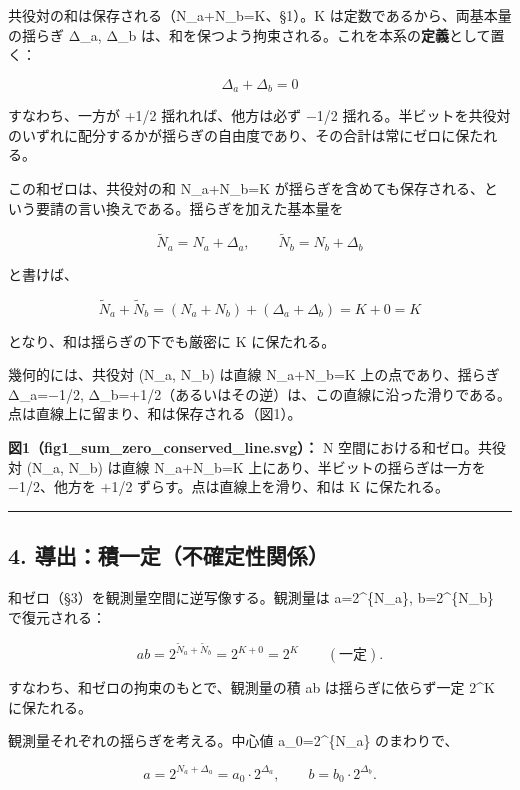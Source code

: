 \documentclass[11pt]{ltjsarticle}
\begin{document}
共役対の和は保存される（N\_a+N\_b=K、§1）。K
は定数であるから、両基本量の揺らぎ Δ\_a, Δ\_b
は、和を保つよう拘束される。これを本系の\textbf{定義}として置く：

\[\boxed{\ \Delta_a + \Delta_b = 0\ }\]

すなわち、一方が +1/2 揺れれば、他方は必ず −1/2
揺れる。半ビットを共役対のいずれに配分するかが揺らぎの自由度であり、その合計は常にゼロに保たれる。

この和ゼロは、共役対の和 N\_a+N\_b=K
が揺らぎを含めても保存される、という要請の言い換えである。揺らぎを加えた基本量を

\[\tilde N_a = N_a + \Delta_a, \qquad \tilde N_b = N_b + \Delta_b\]

と書けば、

\[\tilde N_a + \tilde N_b = (N_a+N_b) + (\Delta_a+\Delta_b) = K + 0 = K\]

となり、和は揺らぎの下でも厳密に K に保たれる。

幾何的には、共役対 (N\_a, N\_b) は直線 N\_a+N\_b=K 上の点であり、揺らぎ
Δ\_a=−1/2,
Δ\_b=+1/2（あるいはその逆）は、この直線に沿った滑りである。点は直線上に留まり、和は保存される（図1）。

\textbf{図1（fig1\_sum\_zero\_conserved\_line.svg）：} N
空間における和ゼロ。共役対 (N\_a, N\_b) は直線 N\_a+N\_b=K
上にあり、半ビットの揺らぎは一方を −1/2、他方を +1/2
ずらす。点は直線上を滑り、和は K に保たれる。

\begin{center}\rule{0.5\linewidth}{0.5pt}\end{center}

\subsection{4.
導出：積一定（不確定性関係）}\label{ux5c0eux51faux7a4dux4e00ux5b9aux4e0dux78baux5b9aux6027ux95a2ux4fc2}

和ゼロ（§3）を観測量空間に逆写像する。観測量は a=2\^{}\{\tilde N\_a\},
b=2\^{}\{\tilde N\_b\} で復元される：

\[ab = 2^{\tilde N_a + \tilde N_b} = 2^{K + 0} = 2^{K} \qquad (\text{一定}).\]

すなわち、和ゼロの拘束のもとで、観測量の積 ab は揺らぎに依らず一定
2\^{}K に保たれる。

観測量それぞれの揺らぎを考える。中心値 a\_0=2\^{}\{N\_a\} のまわりで、

\[a = 2^{N_a + \Delta_a} = a_0\cdot 2^{\Delta_a}, \qquad b = b_0\cdot 2^{\Delta_b}.\]
\end{document}
